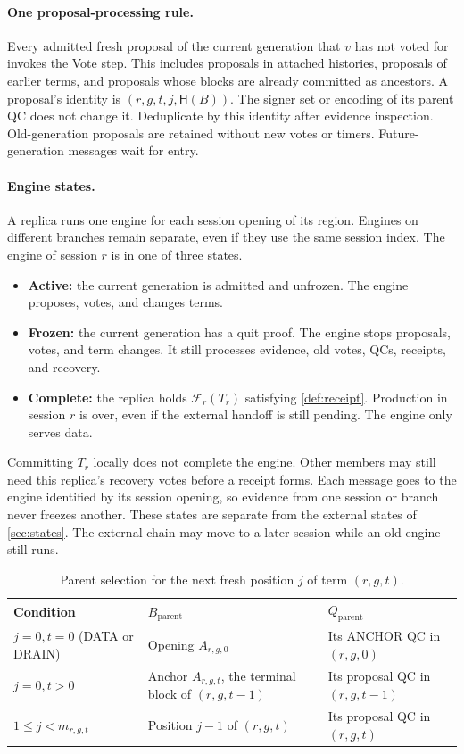 \documentclass[11pt,a4paper]{article}
\newcommand{\FC}{\mathcal F}
\newcommand{\Hash}{\mathsf H}
\begin{document}
\paragraph{One proposal-processing rule.}
Every admitted fresh proposal of the current generation that $v$ has not
voted for invokes the Vote step. This includes proposals in attached
histories, proposals of earlier terms, and proposals whose blocks are
already committed as ancestors. A proposal's identity is
$(r,g,t,j,\Hash(B))$. The signer set or encoding of its parent QC does
not change it. Deduplicate by this identity after evidence inspection.
Old-generation proposals are retained without new votes or timers.
Future-generation messages wait for entry.

\paragraph{Engine states.}
A replica runs one engine for each session opening of its region.
Engines on different branches remain separate, even if they use the
same session index. The engine of
session $r$ is in one of three states.
\begin{itemize}
\item \textbf{Active:} the current generation is admitted and unfrozen.
The engine proposes, votes, and changes terms.
\item \textbf{Frozen:} the current generation has a quit proof. The
engine stops proposals, votes, and term changes. It still processes
evidence, old votes, QCs, receipts, and recovery.
\item \textbf{Complete:} the replica holds $\FC_r(T_r)$ satisfying
\cref{def:receipt}.
Production in session $r$ is over, even if the external handoff is still
pending. The engine only serves data.
\end{itemize}
Committing $T_r$ locally does not complete the engine. Other members may
still need this replica's recovery votes before a receipt forms. Each
message goes to the engine identified by its session opening, so
evidence from one session or branch never freezes another. These states are separate from the external
states of \cref{sec:states}. The external chain may move to a later
session while an old engine still runs.

\begin{table}[htbp]\centering\small
\caption{Parent selection for the next fresh position $j$ of term $(r,g,t)$.}
\label{tab:parent}
\begin{tabularx}{\linewidth}{@{}l Y Y@{}}
\toprule
Condition & $B_{\mathrm{parent}}$ & $Q_{\mathrm{parent}}$\\
\midrule
$j=0,t=0$ (DATA or DRAIN) & Opening $A_{r,g,0}$ & Its ANCHOR QC in $(r,g,0)$\\
$j=0,t>0$ & Anchor $A_{r,g,t}$, the terminal block of $(r,g,t-1)$ & Its proposal QC in $(r,g,t-1)$\\
$1\le j<m_{r,g,t}$ & Position $j-1$ of $(r,g,t)$ & Its proposal QC in $(r,g,t)$\\
\bottomrule
\end{tabularx}
\end{table}
\end{document}

